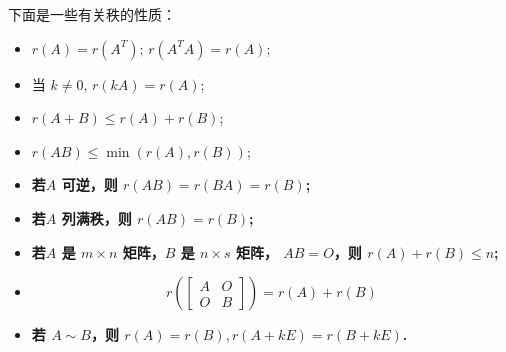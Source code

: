 \begin{corollary}
    下面是一些有关秩的性质： 

    \begin{itemize}
        \item $r(A) = r(A^T); \, r(A^TA) = r(A)$;
        \item 当 $k \neq 0$, $r(kA) = r(A)$;
        \item $r(A+B) \leq r(A) + r(B)$;
        \item $r(AB) \leq \min(r(A), r(B))$;
        \item \textbf{若$A$ 可逆，则 $r(AB) = r(BA) = r(B)$;}
        \item \textbf{若$A$ 列满秩，则 $r(AB) = r(B)$;}
        \item \textbf{若$A$ 是 $m \times n$ 矩阵，$B$ 是 $n \times s$ 矩阵，
            $AB = O$，则 $r(A) + r(B) \leq n$;}
        \item \[
                r\left(\begin{bmatrix}
                        A & O \\
                        O & B 
                \end{bmatrix}\right) = r(A) + r(B)
            \]
        \item \textbf{若 $A \sim B$，则 $r(A) = r(B), r(A + kE) = r(B + kE)$.}
    \end{itemize}
\end{corollary}

